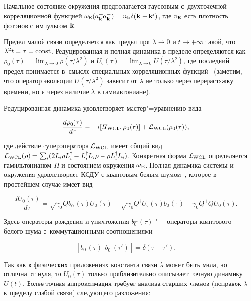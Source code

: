 Начальное состояние окружения предполагается гауссовым с~двухточечной корреляционной функцией $\omega_{\rm E}(a_{\bf k}^{+} a_{\bf k}^{-})=n_{\bf k}\delta({\bf k}-{\bf k}')$, где $n_{\bf k}$ есть плотность фотонов с импульсом ${\bf k}$.



Предел малой связи определяется как предел при $\lambda\to 0$ и $t\to+\infty$ такой, что $\lambda^2 t=\tau={\rm const}$. Редуцированная и полная динамика в пределе определяются как $\rho_0(\tau)=\lim_{\lambda\to 0}\rho(\tau/\lambda^2)$ и $U_0(\tau)=\lim_{\lambda\to 0} U(\tau/\lambda^2)$, где последний предел понимается в~смысле специальных корреляционных функций~\cite{ALV} (заметим, что оператор эволюции $U(\tau/\lambda^2)$ зависит от $\lambda$ не только через перерастяжку времени, но и через наличие $\lambda$ в гамильтониане). 

Редуцированная динамика удовлетворяет мастер"=уравнению вида~\cite{Breuer}

\begin{equation}\label{wclme}

\frac{d\rho_0(\tau)}{d\tau}=-i[H_{\rm WCL},\rho_0(\tau)]+{\cal L}_{\rm WCL}(\rho_0(\tau)),

\end{equation}

где действие супероператора ${\cal L}_{\rm WCL}$ имеет общий вид ${\cal L}_{\rm WCL}(\rho)=\sum_i(2L_i\rho L^\dagger_i-L^\dagger_iL_i\rho-\rho L^\dagger_iL_i)$. Конкретная форма ${\cal L}_{\rm WCL}$ определяется гамильтонианом $H$ и состоянием окружения $\omega_{\rm E}$. Полная динамика системы и окружения удовлетворяет КСДУ с квантовым белым шумом~\cite{ALV}, которое в простейшем случае имеет вид

\[

\frac{dU_0(\tau)}{d\tau}=\sqrt{\gamma_0}Qb_0^{+}(\tau)U_0(\tau)-\sqrt{\gamma_0}Q^\dagger U_0(\tau)b_0(\tau)-\gamma_0Q^{+}QU_0(\tau).

\]

Здесь операторы рождения и уничтожения $b_0^\pm(\tau)$ "--- операторы квантового белого шума с~коммутационными соотношениями

\begin{equation}\label{wn}

[b_0^{-}(\tau),b_0^{+}(\tau')]=\delta (\tau-\tau').

\end{equation}



Так как в физических приложениях константа связи $\lambda$ может быть мала, но отлична от нуля, то $U_0(\tau)$ только приблизительно описывает точную динамику $U(t)$. Более точная аппроксимация требует анализа старших членов (поправок $\lambda$ к пределу слабой связи) следующего разложения:

